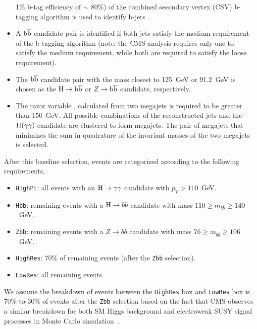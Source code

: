 \begin{itemize}
  1\% b-tag efficiency of $\sim$ 80\%) of the combined secondary vertex (CSV) b-tagging
  algorithm is used to identify b-jets~\cite{btag8TeV}.
\item A $\mathrm{b}\overline{\mathrm{b}}$ candidate pair is identified if both jets satisfy the medium requirement of
  the b-tagging algorithm (note: the CMS analysis requires only one to
  satisfy the medium requirement, while both are required to satisfy
  the loose requirement).
\item The $\mathrm{b}\overline{\mathrm{b}}$ candidate pair with the mass closest to 125~GeV or 91.2~GeV is chosen as the $\mathrm{H}\to
  \mathrm{b}\overline{\mathrm{b}}$ or $Z\to \mathrm{b}\overline{\mathrm{b}}$ candidate, respectively.
\item The razor variable \MR, calculated from two megajets is required to be greater than
  $150$~GeV. All possible combinations of the reconstructed jets and
the $\mathrm{H}(\gamma\gamma)$ candidate are clustered to form megajets. The pair of megajets that
minimizes the sum in quadrature of the invariant masses of the two megajets is selected.
\end{itemize}

After this baseline selection, events are categorized according to the
following requirements,
\begin{itemize}
\item \texttt{HighPt}: all events with an $\mathrm{H}\to\gamma\gamma$ candidate
  with $p_{T}>110$~GeV. 
\item \texttt{Hbb}: remaining events with a $\mathrm{H}\to b\bar{b}$ candidate
  with mass $110\geq m_{b\bar{b}}\geq 140$~GeV. 
\item \texttt{Zbb}: remaining events with a $Z\to b\bar{b}$ candidate
  with mass $76\geq m_{b\bar{b}}\geq 106$~GeV. 
\item \texttt{HighRes}: 70\% of remaining events (after the \texttt{Zbb} selection). 
\item \texttt{LowRes}: all remaining events. 
\end{itemize}
We assume the breakdown of events between the \texttt{HighRes} box and \texttt{LowRes}
box is 70\%-to-30\% of events after the \texttt{Zbb} selection based on the fact that CMS 
observes a similar breakdown for both SM Higgs background and
electroweak SUSY signal processes in Monte Carlo simulation~\cite{RazorHgaga}.


